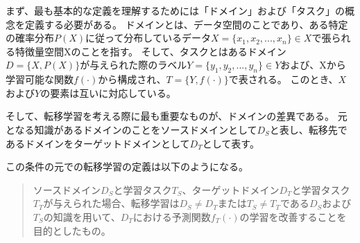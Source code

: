     まず、最も基本的な定義を理解するためには「ドメイン」および「タスク」の概念を定義する必要がある。
    ドメインとは、データ空間のことであり、ある特定の確率分布$P(X)$に従って分布しているデータ$X=\{x_1,x_2,...,x_n\}\in X$で張られる特徴量空間Xのことを指す。
    そして、タスクとはあるドメイン$D=\{X,P(X)\}$が与えられた際のラベル$Y=\{y_1,y_2,...,y_n\}\in Y$および、Xから学習可能な関数$f(\cdot )$から構成され、$T=\{Y,f(\cdot)\}$で表される。
    このとき、$X$および$Y$の要素は互いに対応している。
    
    そして、転移学習を考える際に最も重要なものが、ドメインの差異である。
    元となる知識があるドメインのことをソースドメインとして$D_S$と表し、転移先であるドメインをターゲットドメインとして$D_T$として表す。
    
    この条件の元での転移学習の定義は以下のようになる\cite{pan2009survey}。
    \begin{quote}
        ソースドメイン$D_S$と学習タスク$T_S$、ターゲットドメイン$D_T$と学習タスク$T_T$が与えられた場合、転移学習は$D_S \neq D_T$または$T_S \neq T_T$である$D_S$および$T_S$の知識を用いて、$D_T$における予測関数$f_T(\cdot)$の学習を改善することを目的としたもの。
    \end{quote}

